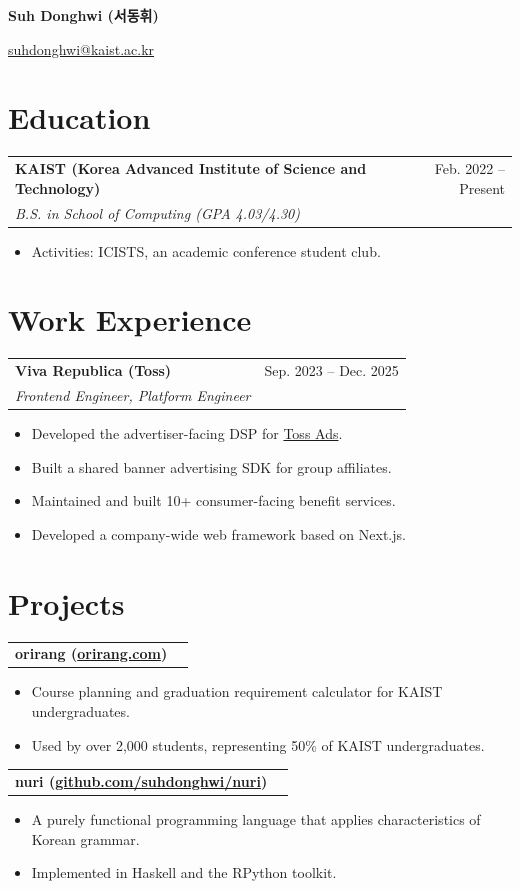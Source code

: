 \documentclass[11pt,a4paper]{article}
\makeatletter
\newcommand{\cvheader}[2]{%
  {\LARGE\bfseries #1}\par\vspace{6pt}
  {\normalsize #2}\par\vspace{8pt}
}
\newcommand{\entry}[3]{%
  \begin{tabularx}{\textwidth}{@{}Xr@{}}
    \textbf{#1} & #2 \\
    \textit{#3} & \\
  \end{tabularx}\vspace{1pt}
}
\newcommand{\project}[2]{%
  \begin{tabularx}{\textwidth}{@{}Xr@{}}
    \textbf{#1} & #2 \\
  \end{tabularx}\vspace{1pt}
}
\makeatother
\begin{document}
\cvheader{Suh Donghwi (서동휘)}{\href{mailto:suhdonghwi@kaist.ac.kr}{suhdonghwi@kaist.ac.kr}}

\section{Education}
\entry{KAIST (Korea Advanced Institute of Science and Technology)}{Feb. 2022 -- Present}{B.S. in School of Computing (GPA 4.03/4.30)}
\begin{itemize}
  \item Activities: ICISTS, an academic conference student club.
\end{itemize}

\section{Work Experience}
\entry{Viva Republica (Toss)}{Sep. 2023 -- Dec. 2025}{Frontend Engineer, Platform Engineer}
\begin{itemize}
  \item Developed the advertiser-facing DSP for \href{https://tossads.toss.im/}{Toss Ads}.
  \item Built a shared banner advertising SDK for group affiliates.
  \item Maintained and built 10+ consumer-facing benefit services.
  \item Developed a company-wide web framework based on Next.js.
\end{itemize}

\section{Projects}
\project{orirang (\href{https://orirang.com}{orirang.com})}{}
\begin{itemize}
  \item Course planning and graduation requirement calculator for KAIST undergraduates.
  \item Used by over 2,000 students, representing 50\% of KAIST undergraduates.
\end{itemize}

\project{nuri (\href{https://github.com/suhdonghwi/nuri}{github.com/suhdonghwi/nuri})}{}
\begin{itemize}
  \item A purely functional programming language that applies characteristics of Korean grammar.
  \item Implemented in Haskell and the RPython toolkit.
\end{itemize}
\end{document}
